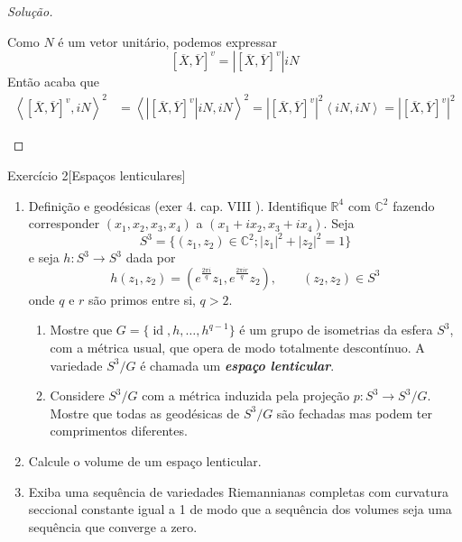 \begin{proof}[Solução]
\begin{enumerate}[label=(\alph*)]
Como \(N\) é um vetor unitário, podemos expressar 
\[\left[ \overline{X},\overline{Y} \right]^v=\left|\left[ \overline{X},\overline{Y} \right]^v\right| i N\]
Então acaba que
\begin{align*}
\left<\left[ \overline{X},\overline{Y} \right]^v, iN\right>^2&=\left<\left|\left[ \overline{X},\overline{Y} \right]^v\right| i N, i N\right>^2=\left|\left[ \overline{X},\overline{Y} \right]^v\right|^2 \left<i N, i N\right>=\left|\left[ \overline{X},\overline{Y} \right]^v\right|^2
\end{align*}
\end{enumerate}
\end{proof}

\begin{thing6}{Exercício 2}[Espaços lenticulares]\label{exer:2}\leavevmode
\begin{enumerate}[label=(\alph*)]
\item Definição e geodésicas (exer 4. cap. VIII \cite{doc}). Identifique \(\mathbb{R}^4\) com \(\mathbb{C}^2\) fazendo corresponder \((x_1,x_2,x_3,x_4)\) a \((x_1+ix_2,x_3+ix_4)\). Seja
	\[S^3=\{(z_1,z_2) \in \mathbb{C}^{2};|z_1|^2+|z_2|^2=1\}\]
	e seja \(h:S^3 \to S^3\) dada por
	\[h(z_1,z_2)=\left(e^{\frac{2\pi i}{q}}z_1,e^{\frac{2\pi i r}{q}}z_2\right) , \qquad  (z_2,z_2) \in S^3\]
	onde \(q \) e \(r\) são primos entre si, \(q>2\).
	\begin{enumerate}[label=(\roman*)]
	\item Mostre que \(G=\{\operatorname{id},h,\ldots, h ^{q-1}\}\) é um grupo de isometrias da esfera \(S^3\), com a métrica usual, que opera de modo totalmente descontínuo. A variedade \(S^3/G\) é chamada um \textit{\textbf{espaço lenticular}}.
	\item Considere \(S^3/G\) com a métrica induzida pela projeção \(p:S^3 \to S^3/G\). Mostre que todas as geodésicas de \(S^3/G\) são fechadas mas podem ter comprimentos diferentes.
	\end{enumerate}
\item Calcule o volume de um espaço lenticular.
\item Exiba uma sequência de variedades Riemannianas completas com curvatura seccional constante igual a 1 de modo que a sequência dos volumes seja uma sequência que converge a zero.

\end{enumerate}
\end{thing6}

